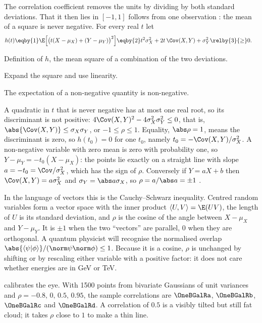 The correlation coefficient removes the units by dividing by both standard
deviations. That it then lies in $[-1,1]$ follows from one observation
: the mean of a square is never negative.
For every real $t$ let
\begin{align*}
  h(t)
  &\eqby{1} \E\Bigl[\bigl(t(X-\mu_X)+(Y-\mu_Y)\bigr)^2\Bigr]
   \eqby{2} t^2\sigma_X^2+2t\,\Cov(X,Y)+\sigma_Y^2
   \relby{3}{\ge} 0 .
\end{align*}
\begin{explain}
  \item Definition of $h$, the mean square of a combination of the two
        deviations.
  \item Expand the square and use linearity.
  \item The expectation of a non-negative quantity is non-negative.
\end{explain}
A quadratic in $t$ that is never negative has at most one real root, so its
discriminant is not positive: $4\Cov(X,Y)^2-4\sigma_X^2\sigma_Y^2\le0$, that
is, $\abs{\Cov(X,Y)}\le\sigma_X\sigma_Y$, or $-1\le\rho\le1$. Equality,
$\abs\rho=1$, means the discriminant is zero, so $h(t_0)=0$ for one $t_0$,
namely $t_0=-\Cov(X,Y)/\sigma_X^2$. A non-negative variable with zero mean is
zero with probability one, so $Y-\mu_Y=-t_0(X-\mu_X)$: the points lie exactly
on a straight line with slope $a=-t_0=\Cov/\sigma_X^2$, which has the sign of
$\rho$. Conversely if $Y=aX+b$ then $\Cov(X,Y)=a\sigma_X^2$ and
$\sigma_Y=\abs a\sigma_X$, so $\rho=a/\abs a=\pm1$ .

In the language of vectors this is the Cauchy--Schwarz inequality. Centred
random variables form a vector space with the inner product
$\langle U,V\rangle=\E(UV)$, the length of $U$ is its standard deviation,
and $\rho$ is the cosine of the angle between $X-\mu_X$ and $Y-\mu_Y$. It is
$\pm1$ when the two ``vectors'' are parallel, $0$ when they are orthogonal. A
quantum physicist will recognise the normalised overlap
$\abs{\langle\psi\vert\phi\rangle}/(\norm\psi\norm\phi)\le1$. Because it is a
cosine, $\rho$ is unchanged by shifting or by rescaling either variable with
a positive factor: it does not care whether energies are in GeV or TeV.

 calibrates the eye. With 1500 points from
bivariate Gaussians of unit variances and $\rho=-0.8,\,0,\,0.5,\,0.95$, the
sample correlations are $\OneBGalRa$, $\OneBGalRb$, $\OneBGalRc$ and
$\OneBGalRd$. A correlation of $0.5$ is a visibly tilted but still fat cloud;
it takes $\rho$ close to $1$ to make a thin line.

